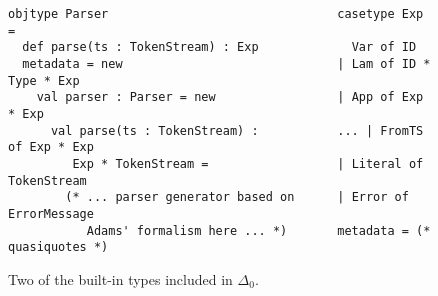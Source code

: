 \begin{figure}[t]
\begin{lstlisting}
objtype Parser                                casetype Exp = 
  def parse(ts : TokenStream) : Exp             Var of ID
  metadata = new                              | Lam of ID * Type * Exp
    val parser : Parser = new                 | App of Exp * Exp
      val parse(ts : TokenStream) :           ... | FromTS of Exp * Exp
         Exp * TokenStream =                  | Literal of TokenStream
        (* ... parser generator based on      | Error of ErrorMessage
           Adams' formalism here ... *)       metadata = (* quasiquotes *)
\end{lstlisting}
\caption{Two of the built-in types included in $\Delta_0$.}
\label{fig:typeParser}
\end{figure}
%

